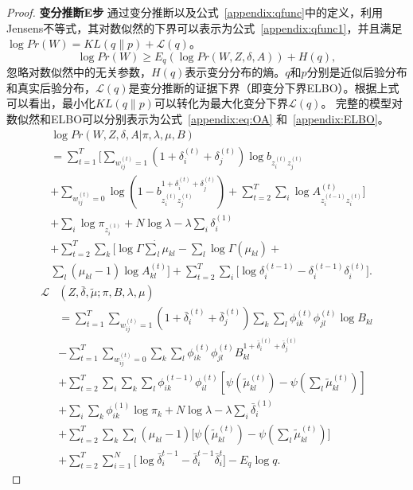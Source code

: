\begin{proof}
	\textbf{变分推断E步}
	通过变分推断以及公式~\ref{appendix:qfunc}中的定义，利用Jensens不等式，其对数似然的下界可以表示为公式~\ref{appendix:qfunc1}，并且满足$\log Pr(W) = KL(q \| p) + \mathscr{L}(q)$。  
	\begin{equation}
		\log Pr(W)\ge E_q(\log Pr(W, Z,\delta, A) ) + H(q),
		\label{appendix:qfunc1}
	\end{equation}
	忽略对数似然中的无关参数，$H(q)$表示变分分布的熵。$q$和$p$分别是近似后验分布和真实后验分布，$\mathscr{L}(q)$是变分推断的证据下界（即变分下界ELBO）。根据上式可以看出，最小化$KL(q \| p)$可以转化为最大化变分下界$\mathscr{L}(q)$。  
	完整的模型对数似然和ELBO可以分别表示为公式~\ref{appendix:eq:OA} 和~\ref{appendix:ELBO}。
	\begin{align}
		&\log Pr(W, Z,\delta, A|\pi, \lambda, \mu, B) \nonumber\\
		&  =\sum_{t=1}^{T} \bigg[ \sum_{w_{ij}^{(t)}=1} (1+\delta_i^{(t)}+\delta_j^{(t)}) \log b_{z_i^{(t)} z_j^{(t)}}  \nonumber\\
		& +\sum_{w_{ij}^{(t)}=0} \log (1-b_{z_i^{(t)}  z_j^{(t)}}^{1+\delta_i^{(t)}+\delta_j^{(t)}})+\sum_{t=2}^{T} \sum_{i} \log A_{z_i^{(t-1)} z_i^{(t)}}^{(t)}  \bigg]  \nonumber \\
		&  +\sum_{i} \log \pi_{z_i^{(1)}} + N\log \lambda  -\lambda \sum_{i} \delta_i^{(1)}  \nonumber \\
		& +\sum_{t=2}^{T} \sum_k \Big[\log \Gamma \dot\sum_l \mu_{kl} - \sum_l \log \Gamma(\mu_{kl}) + \nonumber\\
		& \sum_l(\mu_{kl} - 1)\log A_{kl}^{(t)} \Big]  +\sum_{t=2}^{T} \sum_i \Big[ \log \delta_i^{(t-1)} - \delta_i^{(t-1)} \delta_i^{(t)} \Big].  
		\label{appendix:eq:OA}
	\end{align}
	\begin{align}
		\mathscr{L} & (Z,\bar{\delta},\tilde{\mu};\pi,B,\lambda,\mu) \nonumber \\
		& = \sum_{t=1}^T \sum_{w_{ij}^{(t)}=1} (1+\bar{\delta}_i^{(t)}+\bar{\delta}_j^{(t)}) \sum_k \sum_l \phi_{ik}^{(t)}\phi_{jl}^{(t)} \log B_{kl} \nonumber\\
		& -\sum_{t=1}^T \sum_{w_{ij}^{(t)}=0} \sum_k \sum_l \phi_{ik}^{(t)}\phi_{jl}^{(t)}  B_{kl}^{1+\bar{\delta}_i^{(t)}+\bar{\delta}_j^{(t)}} \nonumber\\
		& +\sum_{t=2}^T \sum_i \sum_k \sum_l \phi_{ik}^{(t-1)}\phi_{il}^{(t)} [\psi(\tilde{\mu}_{kl}^{(t)}) - \psi(\sum_l \tilde{\mu}_{kl}^{(t)})]  \nonumber\\
		& +\sum_i \sum_k \phi_{ik}^{(1)} \log \pi_k +  N\log \lambda -\lambda \sum_i \bar{\delta}_i^{(1)}  \nonumber \\
		& +\sum_{t=2}^T \sum_k \sum_l(\mu_{kl} - 1) \Big[\psi(\tilde{\mu}_{kl}^{(t)}) - \psi(\sum_l \tilde{\mu}_{kl}^{(t)})\Big]  \nonumber\\
		& + \sum_{t=2}^{T} \sum_{i=1}^N \big[\log \bar{\delta}_i^{t-1} - \bar{\delta}_i^{t-1} \bar{\delta}_i^{t}\big] -E_q \log q.
		\label{appendix:ELBO}
	\end{align}
	

\end{proof}
